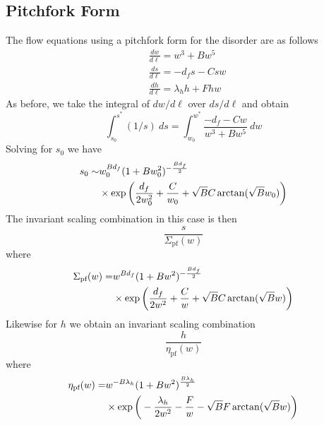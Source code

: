 \documentclass[reprint,amsmath,amssymb,aps,floatfix]{revtex4-1}
\begin{document}
\subsection{\label{app:pitchfork} Pitchfork Form}
The flow equations using a pitchfork form for the disorder are as follows
%
\begin{equation}
	\begin{split}
		&\frac{dw}{d\ell}= w^3+B w^5\\
		&\frac{ds}{d\ell}= -d_f s-C s w\\
		&\frac{dh}{d\ell}= \lambda_h h+F h w
		\end{split}
\end{equation}
%
As before, we take the integral of $dw/d\ell$ over $ds/d\ell$ and obtain
%
\begin{equation}
	\int_{s_0}^{s^*}(1/s)\ ds = \int_{w_0}^{w^*}\frac{-d_f-Cw}{w^3+B w^5}\ dw
\end{equation}
%
\noindent Solving for $s_0$ we have
%
\begin{equation}
	\begin{split}
		s_0 \sim &w_0^{B d_f}(1+B w_0^2)^{-\frac{B d_f}{2}} \\
		&\times \exp \bigg{(}\frac{d_f}{2w_0^2}+\frac{C}{w_0}+\sqrt{B} C \arctan(\sqrt{B}w_0)\bigg{)}
	\end{split}
\end{equation} 
%
\noindent The invariant scaling combination in this case is then
%
\begin{equation}
	\frac{s}{\Sigma_{\textrm{pf}}(w)}
\end{equation}
%
\noindent where
%
\begin{equation}
	\begin{split}
		\Sigma_{\textrm{pf}}(w)  = & w^{B d_f}(1+B w^2)^{-\frac{B d_f}{2}} \\
		& \times \exp \bigg{(}\frac{d_f}{2w^2}+\frac{C}{w}+\sqrt{B} C \arctan(\sqrt{B}w)\bigg{)}
	\end{split}
\end{equation}
%
\noindent Likewise for $h$ we obtain an invariant scaling combination
%
\begin{equation}
	\frac{h}{\eta_{\textrm{pf}}(w)}
\end{equation}
%
\noindent where
%
\begin{equation}
	\begin{split}
		\eta_{\textrm{pf}}(w) = & w^{-B \lambda_h}(1+B w^2)^{\frac{B \lambda_h}{2}} \\
		&\times \exp \bigg{(}-\frac{\lambda_h}{2w^2}-\frac{F}{w}-\sqrt{B} F \arctan(\sqrt{B}w)\bigg{)}
	\end{split}
\end{equation}
\end{document}
